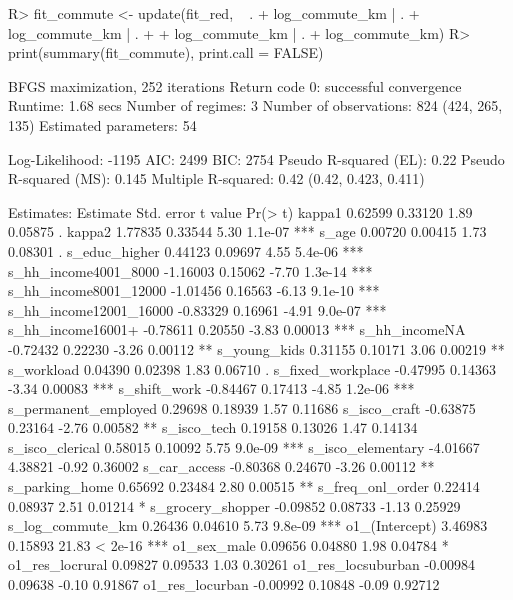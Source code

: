 \documentclass[%
    twoside, openright, titlepage, numbers=noenddot,%
    cleardoublepage=empty,%
    abstract=false,%
    BCOR=5.5mm, paper=a5, fontsize=10pt,%
]{scrreprt}
\begin{document}
\begin{Schunk}
\begin{Sinput}
R> fit_commute <- update(fit_red, ~ . + log_commute_km | . + log_commute_km | . +
+    log_commute_km | . + log_commute_km)
R> print(summary(fit_commute), print.call = FALSE)
\end{Sinput}
\begin{Soutput}
BFGS maximization, 252 iterations
Return code 0: successful convergence 
Runtime: 1.68 secs
Number of regimes: 3 
Number of observations: 824 (424, 265, 135)
Estimated parameters: 54 

Log-Likelihood: -1195 
AIC: 2499 
BIC: 2754 
Pseudo R-squared (EL): 0.22 
Pseudo R-squared (MS): 0.145 
Multiple R-squared: 0.42 (0.42, 0.423, 0.411)

Estimates:
                       Estimate Std. error t value Pr(> t)    
kappa1                  0.62599    0.33120    1.89 0.05875 .  
kappa2                  1.77835    0.33544    5.30 1.1e-07 ***
s_age                   0.00720    0.00415    1.73 0.08301 .  
s_educ_higher           0.44123    0.09697    4.55 5.4e-06 ***
s_hh_income4001_8000   -1.16003    0.15062   -7.70 1.3e-14 ***
s_hh_income8001_12000  -1.01456    0.16563   -6.13 9.1e-10 ***
s_hh_income12001_16000 -0.83329    0.16961   -4.91 9.0e-07 ***
s_hh_income16001+      -0.78611    0.20550   -3.83 0.00013 ***
s_hh_incomeNA          -0.72432    0.22230   -3.26 0.00112 ** 
s_young_kids            0.31155    0.10171    3.06 0.00219 ** 
s_workload              0.04390    0.02398    1.83 0.06710 .  
s_fixed_workplace      -0.47995    0.14363   -3.34 0.00083 ***
s_shift_work           -0.84467    0.17413   -4.85 1.2e-06 ***
s_permanent_employed    0.29698    0.18939    1.57 0.11686    
s_isco_craft           -0.63875    0.23164   -2.76 0.00582 ** 
s_isco_tech             0.19158    0.13026    1.47 0.14134    
s_isco_clerical         0.58015    0.10092    5.75 9.0e-09 ***
s_isco_elementary      -4.01667    4.38821   -0.92 0.36002    
s_car_access           -0.80368    0.24670   -3.26 0.00112 ** 
s_parking_home          0.65692    0.23484    2.80 0.00515 ** 
s_freq_onl_order        0.22414    0.08937    2.51 0.01214 *  
s_grocery_shopper      -0.09852    0.08733   -1.13 0.25929    
s_log_commute_km        0.26436    0.04610    5.73 9.8e-09 ***
o1_(Intercept)          3.46983    0.15893   21.83 < 2e-16 ***
o1_sex_male             0.09656    0.04880    1.98 0.04784 *  
o1_res_locrural         0.09827    0.09533    1.03 0.30261    
o1_res_locsuburban     -0.00984    0.09638   -0.10 0.91867    
o1_res_locurban        -0.00992    0.10848   -0.09 0.92712    

\end{Soutput}
\end{Schunk}
\end{document}

